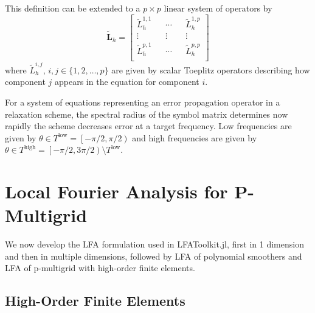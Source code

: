 \documentclass[review]{siamart190516}
\begin{document}
This definition can be extended to a $p \times p$ linear system of operators by
\begin{equation}
\tilde{\mathbf{L}}_h =
\begin{bmatrix}
    \tilde{L}_h^{1, 1} && \cdots && \tilde{L}_h^{1, p} \\
    \vdots             && \vdots && \vdots             \\
    \tilde{L}_h^{p, 1} && \cdots && \tilde{L}_h^{p, p} \\
\end{bmatrix}
\end{equation}
where $\tilde{L}_h^{i, j}$, $i, j \in \lbrace 1, 2, \dots, p \rbrace$ are given by scalar Toeplitz operators describing how component $j$ appears in the equation for component $i$.

For a system of equations representing an error propagation operator in a relaxation scheme, the spectral radius of the symbol matrix determines now rapidly the scheme decreases error at a target frequency.
Low frequencies are given by $\theta \in T^{\text{low}} = \left[ - \pi / 2, \pi / 2 \right)$ and high frequencies are given by $\theta \in T^{\text{high}} = \left[ - \pi / 2, 3 \pi / 2 \right) \setminus T^{\text{low}}$.

\section{Local Fourier Analysis for P-Multigrid}\label{sec:lfa}

We now develop the LFA formulation used in LFAToolkit.jl, first in 1 dimension and then in multiple dimensions, followed by LFA of polynomial smoothers and LFA of p-multigrid with high-order finite elements.

\subsection{High-Order Finite Elements}\label{sec:highorder}
\end{document}
